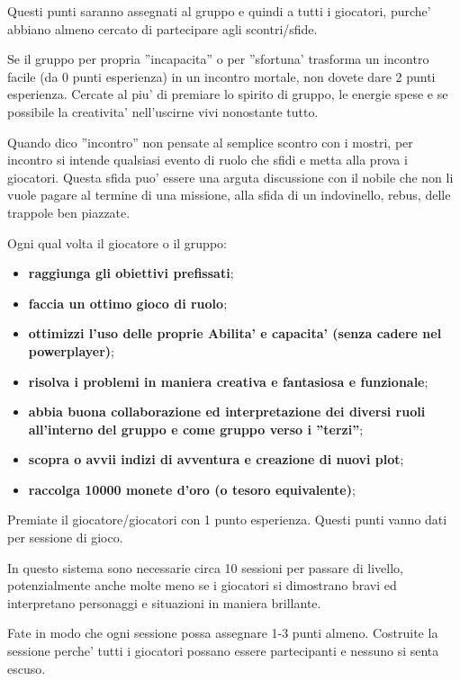 \documentclass[a4paper,11pt,twoside,openany]{book}
\begin{document}
Questi punti saranno assegnati al gruppo e quindi a tutti i giocatori, purche' abbiano almeno cercato di partecipare agli scontri/sfide.

Se il gruppo per propria ''incapacita'' o per ''sfortuna' trasforma un incontro facile (da 0 punti esperienza) in un incontro mortale, non dovete dare 2 punti esperienza. Cercate al piu' di premiare lo spirito di gruppo, le energie spese e se possibile la creativita' nell'uscirne vivi  nonostante tutto.

Quando dico ''incontro'' non pensate al semplice scontro con i mostri, per incontro si intende qualsiasi evento di ruolo che sfidi e metta alla prova i giocatori. Questa sfida puo' essere una arguta discussione con il nobile che non li vuole pagare al termine di una missione, alla sfida di un indovinello, rebus, delle trappole ben piazzate.

\bigskip

Ogni qual volta il giocatore o il gruppo:
\begin{itemize}
\item 
\textbf{raggiunga gli obiettivi prefissati}; 
\item 
\textbf{faccia un ottimo gioco di ruolo}; 
\item 
\textbf{ottimizzi l'uso delle proprie Abilita' e capacita' (senza cadere nel powerplayer)}; 
\item 
\textbf{risolva i problemi in maniera creativa e fantasiosa e funzionale}; 
\item 
\textbf{abbia buona collaborazione ed interpretazione dei diversi ruoli all'interno del gruppo e come gruppo verso i ''terzi''}; 
\item 
\textbf{scopra o avvii indizi di avventura e creazione di nuovi plot};
\item
\textbf{raccolga 10000 monete d'oro (o tesoro equivalente)};
\end{itemize}

\bigskip

Premiate il giocatore/giocatori con 1 punto esperienza. Questi punti vanno dati per sessione di gioco.

In questo sistema sono necessarie circa 10 sessioni per passare di livello, potenzialmente anche molte meno se i giocatori si dimostrano bravi ed interpretano personaggi e situazioni in maniera brillante. 

Fate in modo che ogni sessione possa assegnare 1-3 punti almeno. Costruite la sessione perche' tutti i giocatori possano essere partecipanti e nessuno si senta escuso.
\end{document}
